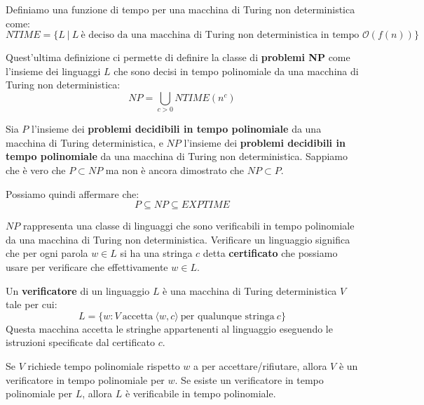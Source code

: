 \begin{definizione}
    Definiamo una funzione di tempo per una macchina di Turing non deterministica come:
    \begin{equation}
        NTIME = \{L \ | \ L \ \text{è deciso da una macchina di Turing non deterministica in tempo } \mathcal{O}(f(n))\}
    \end{equation}
\end{definizione}

Quest'ultima definizione ci permette di definire la classe di \textbf{problemi NP} 
come l'insieme dei linguaggi $L$ che sono decisi in tempo polinomiale da una macchina 
di Turing non deterministica:
\begin{equation}
    NP = \bigcup_{c > 0} NTIME(n^c)
\end{equation}
\begin{osservazione}
Sia $P$ l'insieme dei \textbf{problemi decidibili in tempo polinomiale} da una
 macchina di Turing deterministica, e $NP$ l'insieme dei \textbf{problemi decidibili in tempo polinomiale}
  da una macchina di Turing non deterministica. Sappiamo che è vero che $P \subset NP$ 
  ma non è ancora dimostrato che $NP \subset P$.
\end{osservazione}

Possiamo quindi affermare che:
\begin{equation}
    P \subseteq NP \subseteq EXPTIME
\end{equation}

$NP$ rappresenta una classe di linguaggi che sono verificabili in tempo polinomiale 
da una macchina di Turing non deterministica. Verificare un linguaggio significa 
che per ogni parola $w \in L$ si ha una stringa $c$ detta \textbf{certificato} che 
possiamo usare per verificare che effettivamente $w \in L$.
\begin{definizione}
    Un \textbf{verificatore} di un linguaggio $L$ è una macchina di Turing 
    deterministica $V$ tale per cui:
    \begin{equation}
        L = \{w : V \ \text{accetta} \ \langle w, c \rangle \ \text{per qualunque stringa} \ c\}
    \end{equation}
    Questa macchina accetta le stringhe appartenenti al linguaggio eseguendo le 
    istruzioni specificate dal certificato $c$.
\end{definizione}

Se $V$ richiede tempo polinomiale rispetto $w$ a per accettare/rifiutare, allora 
$V$ è un verificatore in tempo polinomiale per $w$. Se esiste un verificatore in 
tempo polinomiale per $L$, allora $L$ è verificabile in tempo polinomiale. 

